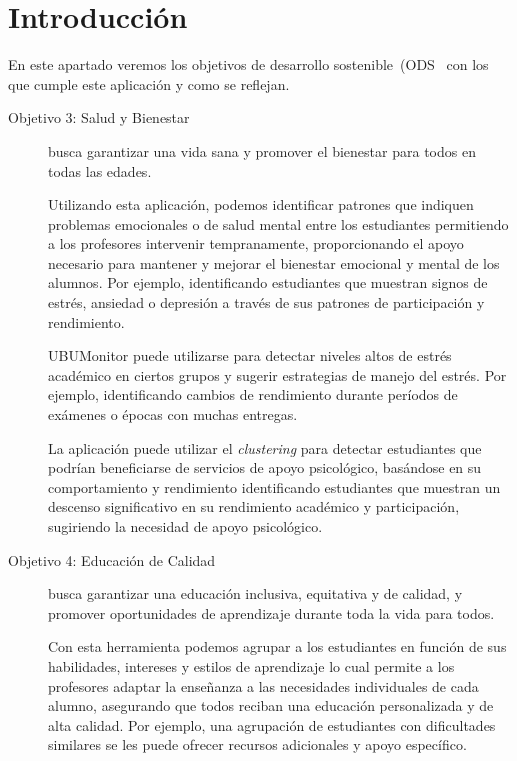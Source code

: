 
\section{Introducción}

En este apartado veremos los objetivos de desarrollo sostenible~(ODS~\cite{ods} con los que cumple este aplicación y como se reflejan.

\begin{description}
    \item[Objetivo 3: Salud y Bienestar] busca garantizar una vida sana y promover el bienestar para todos en todas las edades.

    Utilizando esta aplicación, podemos identificar patrones que indiquen problemas emocionales o de salud mental entre los estudiantes permitiendo a los profesores intervenir tempranamente, proporcionando el apoyo necesario para mantener y mejorar el bienestar emocional y mental de los alumnos. Por ejemplo, identificando estudiantes que muestran signos de estrés, ansiedad o depresión a través de sus patrones de participación y rendimiento.

    UBUMonitor puede utilizarse para detectar niveles altos de estrés académico en ciertos grupos y sugerir estrategias de manejo del estrés. Por ejemplo, identificando cambios de rendimiento durante períodos de exámenes o épocas con muchas entregas.

    La aplicación puede utilizar el \emph{clustering} para detectar estudiantes que podrían beneficiarse de servicios de apoyo psicológico, basándose en su comportamiento y rendimiento identificando estudiantes que muestran un descenso significativo en su rendimiento académico y participación, sugiriendo la necesidad de apoyo psicológico.

    \item[Objetivo 4: Educación de Calidad] busca garantizar una educación inclusiva, equitativa y de calidad, y promover oportunidades de aprendizaje durante toda la vida para todos.
    
    Con esta herramienta podemos agrupar a los estudiantes en función de sus habilidades, intereses y estilos de aprendizaje lo cual permite a los profesores adaptar la enseñanza a las necesidades individuales de cada alumno, asegurando que todos reciban una educación personalizada y de alta calidad. Por ejemplo, una agrupación de estudiantes con dificultades similares se les puede ofrecer recursos adicionales y apoyo específico.


\end{description}

